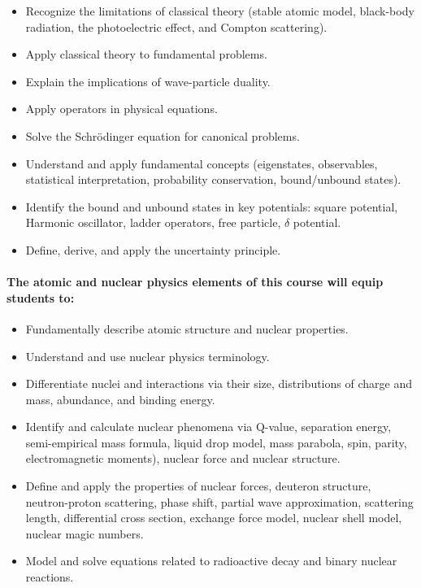 \documentclass[11pt]{article}
\begin{document}
\begin{itemize}
        \item Recognize the limitations of classical theory  (stable atomic 
                model, black-body radiation, the photoelectric effect, and 
                Compton scattering).
        \item Apply classical theory to fundamental problems.
        \item Explain the implications of wave-particle duality.
        \item Apply operators in physical equations.
        \item Solve the Schr\"odinger equation for canonical problems.
        \item Understand and apply fundamental concepts (eigenstates, 
                observables, statistical interpretation, probability 
                conservation, bound/unbound states).
        \item Identify the bound and unbound states in key potentials: square
potential, Harmonic oscillator, ladder operators, free particle, $\delta$ 
                potential.
        \item Define, derive, and apply the uncertainty principle.
\end{itemize}

\paragraph{The atomic and nuclear physics elements of this course will equip students to:}
\begin{itemize}
        \item Fundamentally describe atomic structure and nuclear properties. 
        \item Understand and use nuclear physics terminology.
        \item Differentiate nuclei and interactions via their size, 
                distributions of charge and mass, abundance, and binding energy.
        \item Identify and calculate nuclear phenomena via Q-value, separation energy, semi-empirical
mass formula, liquid drop model, mass parabola, spin, parity, electromagnetic moments), nuclear force and
nuclear structure.
                \item Define and apply the properties of nuclear forces, deuteron structure, neutron-proton scattering, phase shift,
partial wave approximation, scattering length, differential cross section, exchange force model, nuclear
shell model, nuclear magic numbers.
                \item Model and solve equations related to radioactive decay 
                        and binary nuclear reactions.
\end{itemize}
\end{document}
